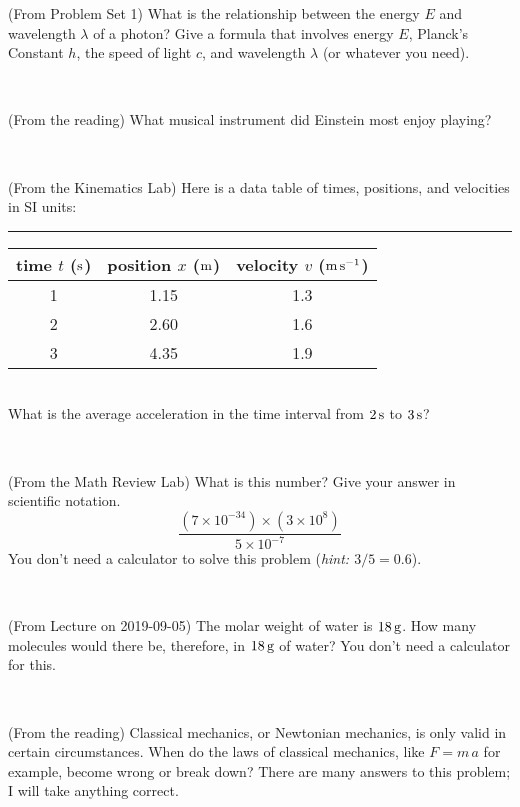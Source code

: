 \documentclass[12pt, letterpaper]{article}
\begin{document}
\begin{problem} (From Problem Set 1)
What is the relationship between the energy $E$ and wavelength
$\lambda$ of a photon? Give a formula that involves energy $E$,
Planck's Constant $h$, the speed of light $c$, and wavelength
$\lambda$ (or whatever you need).
\end{problem}

\vfill ~

\begin{problem} (From the reading)
What musical instrument did Einstein most enjoy playing?
\end{problem}


\vfill ~

\begin{problem} (From the Kinematics Lab)
Here is a data table of times, positions, and velocities in SI units:\\
\rule{1.0in}{0pt}\begin{tabular}{c|c|c}
time $t$ ($\mathrm{s}$) & position $x$ ($\mathrm{m}$) & velocity $v$ ($\mathrm{m}\,\mathrm{s}^{-1}$) \\
\hline
1 & 1.15 & 1.3 \\
2 & 2.60 & 1.6 \\
3 & 4.35 & 1.9 \\
\hline
\end{tabular}\\
What is the average acceleration in the time interval from $2\,\mathrm{s}$ to $3\,\mathrm{s}$?
\end{problem}


\vfill ~

\begin{problem} (From the Math Review Lab)
What is this number? Give your answer in scientific notation.
$$
\frac{(7\times10^{-34})\times(3\times10^8)}{5\times10^{-7}}
$$
You don't need a calculator to solve this problem (\textit{hint: $3/5=0.6$}).
\end{problem}


\vfill ~


\clearpage


\begin{problem} (From Lecture on 2019-09-05)
The molar weight of water is $18\,\mathrm{g}$. How many molecules would there
be, therefore, in $18\,\mathrm{g}$ of water? You don't need a calculator for
this.
\end{problem}


\vfill ~

\begin{problem} (From the reading)
Classical mechanics, or Newtonian mechanics, is only valid in certain
circumstances. When do the laws of classical mechanics, like $F =
m\,a$ for example, become wrong or break down? There are many answers
to this problem; I will take anything correct.
\end{problem}
\end{document}
